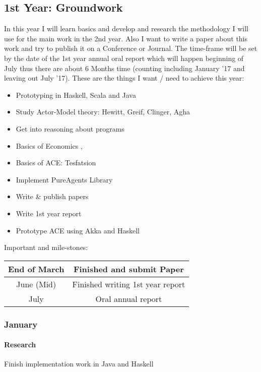 \subsection{1st Year: Groundwork}
In this year I will learn basics and develop and research the methodology I will use for the main work in the 2nd year. Also I want to write a paper about this work and try to publish it on a Conference or Journal. The time-frame will be set by the date of the 1st year annual oral report which will happen beginning of July thus there are about 6 Months time (counting including January '17 and leaving out July '17). These are the things I want / need to achieve this year:

\begin{itemize}
\item Prototyping in Haskell, Scala and Java
\item Study Actor-Model theory: Hewitt, Greif, Clinger, Agha
\item Get into reasoning about programs
\item Basics of Economics \cite{bowles_understanding_2005}, \cite{kirman_complex_2010}
\item Basics of ACE: Tesfatsion
\item Implement PureAgents Library
\item Write \& publish papers
\item Write 1st year report
\item Prototype ACE using Akka and Haskell
\end{itemize}

Important and mile-stones:

\begin{center}
\begin{tabular}{ c|c } 
	End of March & Finished and submit Paper \\ 
	\hline
	June (Mid) & Finished writing 1st year report  \\ 
	\hline
	July & Oral annual report \\
\end{tabular}
\end{center}

\subsubsection{January}
\paragraph{Research} Finish implementation work in Java and Haskell

